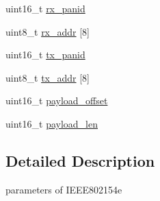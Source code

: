 \begin{DoxyCompactItemize}
\item 
uint16\+\_\+t \hyperlink{structSUBGHZ__MAC_ada4ca30b88f0c0058a74f3ebd0c27816}{rx\+\_\+panid}
\item 
uint8\+\_\+t \hyperlink{structSUBGHZ__MAC_a91947f3cbf0a86565dc59c51847f8e1c}{rx\+\_\+addr} \mbox{[}8\mbox{]}
\item 
uint16\+\_\+t \hyperlink{structSUBGHZ__MAC_a5c8a6b3db84a529da0930cbdbab44511}{tx\+\_\+panid}
\item 
uint8\+\_\+t \hyperlink{structSUBGHZ__MAC_a3c436acb79ae6a41a6ae98a8ea1c1377}{tx\+\_\+addr} \mbox{[}8\mbox{]}
\item 
uint16\+\_\+t \hyperlink{structSUBGHZ__MAC_a513211bfc7443a599fe9fbc5a9b1f381}{payload\+\_\+offset}
\item 
uint16\+\_\+t \hyperlink{structSUBGHZ__MAC_a549d1e13fec06ec689c51094ba364318}{payload\+\_\+len}
\end{DoxyCompactItemize}


\subsection{Detailed Description}
parameters of I\+E\+E\+E802154e 

